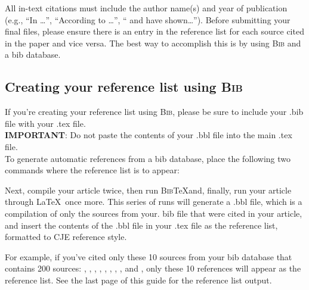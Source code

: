 \documentclass{cje}          %
\theoremstyle{plain}%
\theoremstyle{definition}
\theoremstyle{remark}
\begin{document}
All in-text citations must include the author name(s) and year of publication (e.g., ``In \cite{Lucas90}\ldots'',  ``According to \cite{Van-Zon}\ldots'', ``\cite{Mas-Colell} and \cite{Glomm92} have shown\ldots''). Before submitting your final files, please ensure there is an entry in the reference list for each source cited in the paper and vice versa. The best way to accomplish this is by using \textsc{Bib}\upshape{\TeX} and a bib database.

\subsection{Creating your reference list using \textsc{Bib}\upshape{\TeX}}

If you're creating your reference list using \textsc{Bib}\upshape{\TeX}, please be sure to include your .bib file with your .tex file. \\

\noindent \textbf{IMPORTANT}: Do not paste the contents of your .bbl file into the main .tex file.\\


 To generate automatic references from a bib database, place the following two commands where the reference list is to appear:
\begin{smallverbatim}
\end{smallverbatim}
%
Next, compile your article twice, then run \textsc{Bib}\TeX and, finally,   run your article through \LaTeX\ once more. This series of runs will generate a .bbl file, which is a compilation of only the sources from your. bib file that were cited in your article, and insert the contents of the .bbl file in your .tex file as the reference list, formatted to CJE reference style.

For example, if you've cited only these 10 sources from your bib database that contains 200 sources: 
\cite{Glomm92},
\cite{Mas-Colell},
\cite{Atkinson},
\cite{Van-Zon},
\cite{vanderPolGairns2000},
\cite{Lucas90},
\cite{Mendoza1991}, 
\cite{Glomm97},
\cite{Aisa04} and
\cite{LiSK12}, 
only these 10 references will appear as the reference list. See the last page of this guide for the reference list output.
\end{document}
